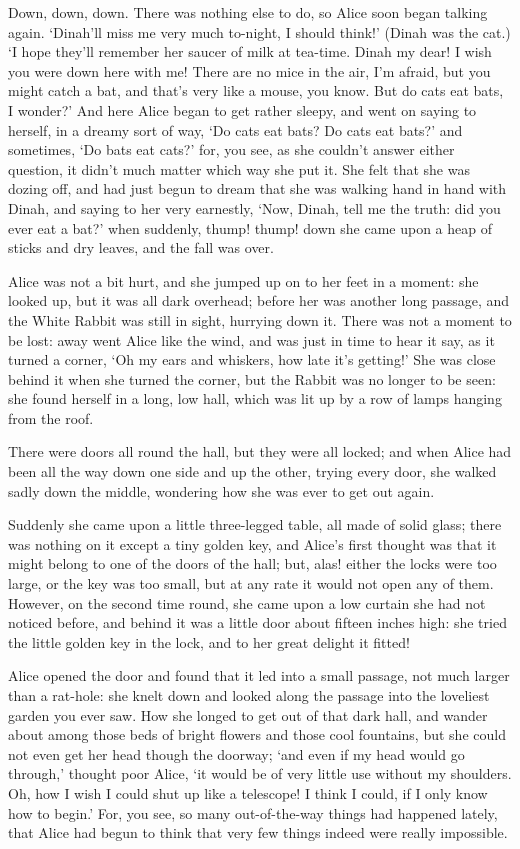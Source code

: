 \documentclass[statementpaper,twoside,openany]{memoir}
\begin{document}
Down, down, down. There was nothing else to do, so Alice soon began talking again. `Dinah'll miss me very much to-night, I should think!' (Dinah was the cat.) `I hope they'll remember her saucer of milk at tea-time. Dinah my dear! I wish you were down here with me! There are no mice in the air, I'm afraid, but you might catch a bat, and that's very like a mouse, you know. But do cats eat bats, I wonder?' And here Alice began to get rather sleepy, and went on saying to herself, in a dreamy sort of way, `Do cats eat bats? Do cats eat bats?' and sometimes, `Do bats eat cats?' for, you see, as she couldn't answer either question, it didn't much matter which way she put it. She felt that she was dozing off, and had just begun to dream that she was walking hand in hand with Dinah, and saying to her very earnestly, `Now, Dinah, tell me the truth: did you ever eat a bat?' when suddenly, thump! thump! down she came upon a heap of sticks and dry leaves, and the fall was over.

Alice was not a bit hurt, and she jumped up on to her feet in a moment: she looked up, but it was all dark overhead; before her was another long passage, and the White Rabbit was still in sight, hurrying down it. There was not a moment to be lost: away went Alice like the wind, and was just in time to hear it say, as it turned a corner, `Oh my ears and whiskers, how late it's getting!' She was close behind it when she turned the corner, but the Rabbit was no longer to be seen: she found herself in a long, low hall, which was lit up by a row of lamps hanging from the roof.

There were doors all round the hall, but they were all locked; and when Alice had been all the way down one side and up the other, trying every door, she walked sadly down the middle, wondering how she was ever to get out again.

Suddenly she came upon a little three-legged table, all made of solid glass; there was nothing on it except a tiny golden key, and Alice's first thought was that it might belong to one of the doors of the hall; but, alas! either the locks were too large, or the key was too small, but at any rate it would not open any of them. However, on the second time round, she came upon a low curtain she had not noticed before, and behind it was a little door about fifteen inches high: she tried the little golden key in the lock, and to her great delight it fitted!

Alice opened the door and found that it led into a small passage, not much larger than a rat-hole: she knelt down and looked along the passage into the loveliest garden you ever saw. How she longed to get out of that dark hall, and wander about among those beds of bright flowers and those cool fountains, but she could not even get her head though the doorway; `and even if my head would go through,' thought poor Alice, `it would be of very little use without my shoulders. Oh, how I wish I could shut up like a telescope! I think I could, if I only know how to begin.' For, you see, so many out-of-the-way things had happened lately, that Alice had begun to think that very few things indeed were really impossible.
\end{document}

